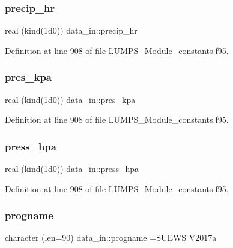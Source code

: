 \mbox{\label{namespacedata__in_aa3e790835200b911e51eba62d37a0c43}} 
\subsubsection{\texorpdfstring{precip\+\_\+hr}{precip\_hr}}
{\footnotesize\ttfamily real (kind(1d0)) data\+\_\+in\+::precip\+\_\+hr}



Definition at line 908 of file L\+U\+M\+P\+S\+\_\+\+Module\+\_\+constants.\+f95.

\mbox{\label{namespacedata__in_a63dc6d1a7d5f10b5c3ebd45aaffb7150}} 
\subsubsection{\texorpdfstring{pres\+\_\+kpa}{pres\_kpa}}
{\footnotesize\ttfamily real (kind(1d0)) data\+\_\+in\+::pres\+\_\+kpa}



Definition at line 908 of file L\+U\+M\+P\+S\+\_\+\+Module\+\_\+constants.\+f95.

\mbox{\label{namespacedata__in_a03eea39f7275fe19868636524b857b6d}} 
\subsubsection{\texorpdfstring{press\+\_\+hpa}{press\_hpa}}
{\footnotesize\ttfamily real (kind(1d0)) data\+\_\+in\+::press\+\_\+hpa}



Definition at line 908 of file L\+U\+M\+P\+S\+\_\+\+Module\+\_\+constants.\+f95.

\mbox{\label{namespacedata__in_a7dd6ee68e2bde1c81c0ed1b6a6e9061b}} 
\subsubsection{\texorpdfstring{progname}{progname}}
{\footnotesize\ttfamily character (len=90) data\+\_\+in\+::progname =\textquotesingle{}S\+U\+E\+WS V2017a\textquotesingle{}}



